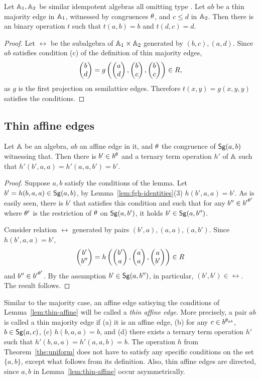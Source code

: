 \documentclass[11pt]{article}
\begin{document}
\begin{lemma}\label{lem:majority-sl}
Let ${\mathbb A}_1,{\mathbb A}_2$ be similar idempotent algebras all omitting type \one.
Let $ab$ be a thin majority edge in ${\mathbb A}_1$, witnessed by congruences $\theta$, and 
$c\le d$ in ${\mathbb A}_2$. Then there is an binary operation $t$ such that $t(a,b)=b$ and 
$t(d,c)=d$.
\end{lemma}

\begin{proof}
Let $\rel$ be the subalgebra of 
${\mathbb A}_1\times{\mathbb A}_2$ generated by $(b,c),(a,d)$. Since $ab$ satisfies condition (c) of
the definition of thin majority edges,
$$
\cl bd=g\left(\cl ad,\cl bc,\cl bc\right)\in\rel,
$$
as $g$ is the first projection on semilattice edges. Therefore $t(x,y)=g(x,y,y)$ satisfies 
the conditions.
\end{proof}


\subsection{Thin affine edges}\label{sec:thin-affine}

\begin{lemma}\label{lem:thin-affine}
Let ${\mathbb A}$ be an algebra, $ab$ an affine edge in it, and $\theta$ the congruence of 
${\sf Sg}(a,b)$ witnessing that. Then there is $b'\in b^\theta$ and a ternary term operation 
$h'$ of ${\mathbb A}$ such that  $h'(b',a,a)=h'(a,a,b')=b'$.
\end{lemma}

\begin{proof}
Suppose $a,b$ satisfy the conditions of the lemma. 
Let $b'=h(b,a,a)\in{\sf Sg}(a,b)$, by Lemma~\ref{lem:fgh-identities}(3) $h(b',a,a)=b'$. 
As is easily seen, there is $b'$ that satisfies this condition and such that for any 
$b''\in{b'}^{\theta'}$ where $\theta'$ is the restriction of $\theta$ on ${\sf Sg}(a,b')$, it holds
$b'\in{\sf Sg}(a,b'')$.

Consider relation $\rel$ generated by pairs $(b',a),(a,a),(a,b')$. Since $h(b',a,a)=b'$, 
$$
\cl{b'}{b''}=h\left(\cl{b'}a,\cl aa,\cl a{b'}\right)\in\rel
$$
and $b''\in {b'}^{\theta'}$. By the assumption $b'\in {\sf Sg}(a,b'')$, in particular, $(b',b')\in\rel$. 
The result follows.
\end{proof}

Similar to the majority case, an affine edge satisying the conditions of 
Lemma~\ref{lem:thin-affine} will be called a \emph{thin affine edge}. More precisely, 
a pair $ab$ is called a thin majority edge if (a) it is an affine edge, (b) for any 
$c\in b^{\theta_{ab}}$, $b\in{\sf Sg}(a,c)$, (c) $h(b,a,a)=b$, and (d) there exists a ternary 
term operation $h'$ such that $h'(b,a,a)=h'(a,a,b)=b$.  The operation $h$ from 
Theorem~\ref{the:uniform} does not have to satisfy any specific conditions on 
the set $\{a,b\}$, except what follows from its definition. Also, thin affine edges
are directed, since $a,b$ in Lemma~\ref{lem:thin-affine} occur asymmetrically.
\end{document}
